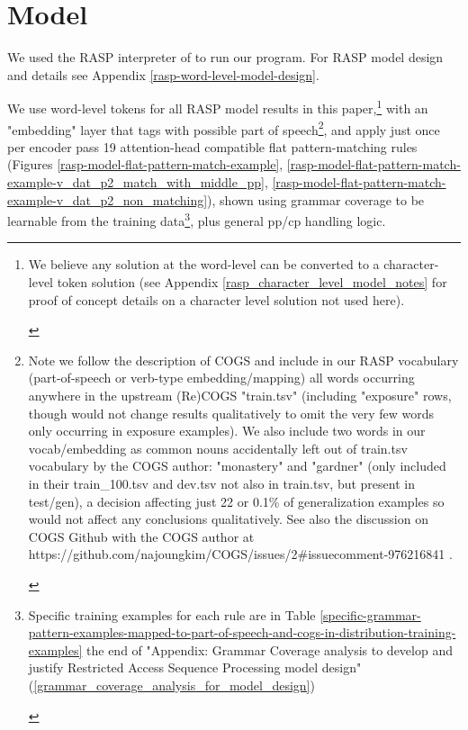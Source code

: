 \documentclass[11pt]{article}
\begin{document}
\section{Model}
\label{model}

We used the RASP interpreter of \cite{Weiss2021} to run our program. For RASP model design and details see Appendix \ref{rasp-word-level-model-design}.

We use word-level tokens for all RASP model results in this paper,\footnote{\begin{footnotesize}We believe any solution at the word-level can be converted to a character-level token solution (see Appendix \ref{rasp_character_level_model_notes} for proof of concept details on a character level solution not used here).
\end{footnotesize}
}
with an "embedding" layer that tags with possible part of speech\footnote{\begin{footnotesize}Note we follow the \cite{klinger2024compositionalprogramgenerationfewshot} description of COGS and include in our RASP vocabulary (part-of-speech or verb-type embedding/mapping) all words occurring anywhere in the upstream (Re)COGS "train.tsv" (including "exposure" rows, though would not change results qualitatively to omit the very few words only occurring in exposure examples). We also include two words in our vocab/embedding as common nouns accidentally left out of train.tsv vocabulary by the COGS author: "monastery" and "gardner" (only included in their train\_100.tsv and dev.tsv not also in train.tsv, but present in test/gen), a decision affecting just 22 or 0.1\% of generalization examples so would not affect any conclusions qualitatively. See also the discussion on COGS Github with the COGS author at https://github.com/najoungkim/COGS/issues/2\#issuecomment-976216841 .\end{footnotesize}}, and apply just once per encoder pass 19 attention-head compatible flat pattern-matching rules (Figures \ref{rasp-model-flat-pattern-match-example}, \ref{rasp-model-flat-pattern-match-example-v_dat_p2_match_with_middle_pp}, \ref{rasp-model-flat-pattern-match-example-v_dat_p2_non_matching}), shown using grammar coverage \cite{fuzzingbook2023:GrammarCoverageFuzzer} to be learnable from the training data\footnote{\begin{footnotesize}Specific training examples for each rule are in Table \ref{specific-grammar-pattern-examples-mapped-to-part-of-speech-and-cogs-in-distribution-training-examples} the end of "Appendix: Grammar Coverage analysis to develop and justify Restricted Access Sequence Processing model design" (\ref{grammar_coverage_analysis_for_model_design})\end{footnotesize}}, plus general pp/cp handling logic.
\end{document}
